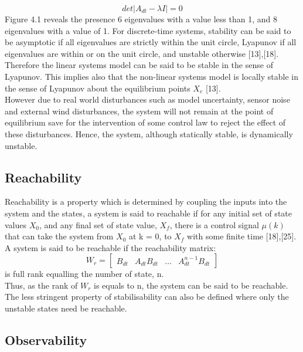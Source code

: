 \documentclass[12pt,a4paper,twoside]{report}
\begin{document}
				\begin{equation}
					det|A_{dt} - \lambda I| = 0
				\end{equation}
				\space
				Figure 4.1 reveals the presence 6 eigenvalues with a value less than 1, and 8 eigenvalues with a value of 1. For discrete-time systems, stability can be said to be asymptotic if all eigenvalues are strictly within the unit circle, Lyapunov if all eigenvalues are within or on the unit circle, and unstable otherwise [13],[18]. Therefore the linear systems model can be said to be stable in the sense of Lyapunov. This implies also that the non-linear systems model is locally stable in the sense of Lyapunov about the equilibrium points $X_e$ [13].
				\\
				However due to real world disturbances such as model uncertainty, sensor noise and external wind disturbances, the system will not remain at the point of equilibrium save for the intervention of some control law to reject the effect of these disturbances. Hence, the system, although statically stable, is dynamically unstable.
				
			\subsection{Reachability}
				
				Reachability is a property which is determined by coupling the inputs into the system and the states, a system is said to reachable if for any initial set of state values $X_0$, and any final set of state value, $X_f$, there is a control signal $\mu(k)$ that can take the system from $X_0$ at k = 0, to  $X_f$ with some finite time [18],[25].
				\\
				A system is said to be reachable if the reachability matrix:
				\begin{equation}
					W_r = 
					\begin{bmatrix}
						B_{dt} & A_{dt}B_{dt} & \dots & A_{dt}^{n-1}B_{dt}
					\end{bmatrix}
				\end{equation}
				is full rank equalling the number of state, n.
				\\
				Thus, as the rank of $W_r$ is equals to n, the system can be said to be reachable. 
				\\
				The less stringent property of stabilisability can also be defined where only the unstable states need be reachable.
				
			\subsection{Observability}
				
\end{document}
